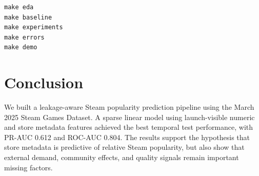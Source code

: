 \documentclass[11pt,sigconf,nonacm]{acmart}
\begin{document}
\begin{verbatim}
make eda
make baseline
make experiments
make errors
make demo
\end{verbatim}

\section{Conclusion}

We built a leakage-aware Steam popularity prediction pipeline using the March 2025 Steam Games Dataset. A sparse linear model using launch-visible numeric and store metadata features achieved the best temporal test performance, with PR-AUC 0.612 and ROC-AUC 0.804. The results support the hypothesis that store metadata is predictive of relative Steam popularity, but also show that external demand, community effects, and quality signals remain important missing factors.



\end{document}
